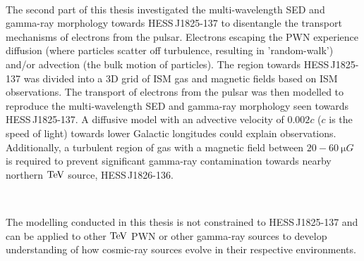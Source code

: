 \par~\par
The second part of this thesis investigated the multi-wavelength SED and gamma-ray morphology towards \mbox{HESS\,J1825-137} to disentangle the transport mechanisms of electrons from the pulsar. Electrons escaping the PWN experience diffusion (where particles scatter off turbulence, resulting in 'random-walk') and/or advection (the bulk motion of particles). The region towards \mbox{HESS\,J1825-137} was divided into a 3D grid of ISM gas and magnetic fields based on ISM observations. The transport of electrons from the pulsar was then modelled to reproduce the multi-wavelength SED and gamma-ray morphology seen towards \mbox{HESS\,J1825-137}. A diffusive model with an advective velocity of $0.002c$ ($c$ is the speed of light) towards lower Galactic longitudes could explain observations. Additionally, a turbulent region of gas with a magnetic field between $20-60~\si{\micro G}$ is required to prevent significant gamma-ray contamination towards nearby northern $\TeV$ source, \mbox{HESS\,J1826-136}.
\par~\par
The modelling conducted in this thesis is not constrained to \mbox{HESS\,J1825-137} and can be applied to other $\TeV$ PWN or other gamma-ray sources to develop understanding of how cosmic-ray sources evolve in their respective environments.
